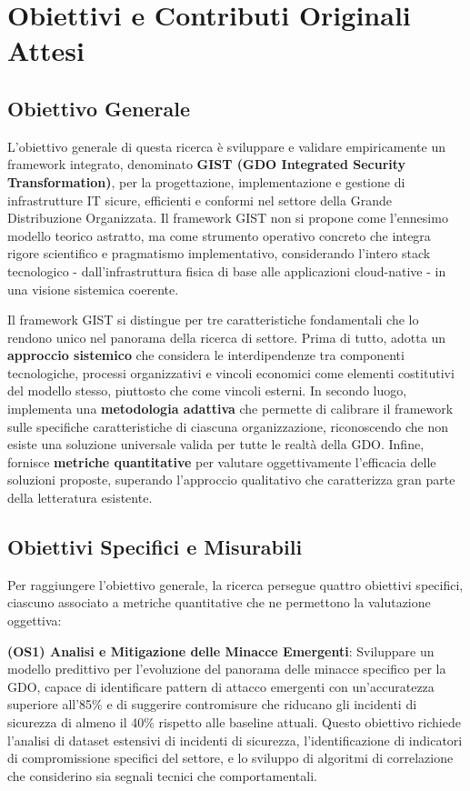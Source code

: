 \section{Obiettivi e Contributi Originali Attesi}

\subsection{Obiettivo Generale}

L'obiettivo generale di questa ricerca è sviluppare e validare empiricamente un framework integrato, denominato \textbf{GIST (GDO Integrated Security Transformation)}, per la progettazione, implementazione e gestione di infrastrutture IT sicure, efficienti e conformi nel settore della Grande Distribuzione Organizzata. Il framework GIST non si propone come l'ennesimo modello teorico astratto, ma come strumento operativo concreto che integra rigore scientifico e pragmatismo implementativo, considerando l'intero stack tecnologico - dall'infrastruttura fisica di base alle applicazioni cloud-native - in una visione sistemica coerente.

Il framework GIST si distingue per tre caratteristiche fondamentali che lo rendono unico nel panorama della ricerca di settore. Prima di tutto, adotta un \textbf{approccio sistemico} che considera le interdipendenze tra componenti tecnologiche, processi organizzativi e vincoli economici come elementi costitutivi del modello stesso, piuttosto che come vincoli esterni. In secondo luogo, implementa una \textbf{metodologia adattiva} che permette di calibrare il framework sulle specifiche caratteristiche di ciascuna organizzazione, riconoscendo che non esiste una soluzione universale valida per tutte le realtà della GDO. Infine, fornisce \textbf{metriche quantitative} per valutare oggettivamente l'efficacia delle soluzioni proposte, superando l'approccio qualitativo che caratterizza gran parte della letteratura esistente.

\subsection{Obiettivi Specifici e Misurabili}

Per raggiungere l'obiettivo generale, la ricerca persegue quattro obiettivi specifici, ciascuno associato a metriche quantitative che ne permettono la valutazione oggettiva:

\textbf{(OS1) Analisi e Mitigazione delle Minacce Emergenti}: Sviluppare un modello predittivo per l'evoluzione del panorama delle minacce specifico per la GDO, capace di identificare pattern di attacco emergenti con un'accuratezza superiore all'85\% e di suggerire contromisure che riducano gli incidenti di sicurezza di almeno il 40\% rispetto alle baseline attuali. Questo obiettivo richiede l'analisi di dataset estensivi di incidenti di sicurezza, l'identificazione di indicatori di compromissione specifici del settore, e lo sviluppo di algoritmi di correlazione che considerino sia segnali tecnici che comportamentali.

